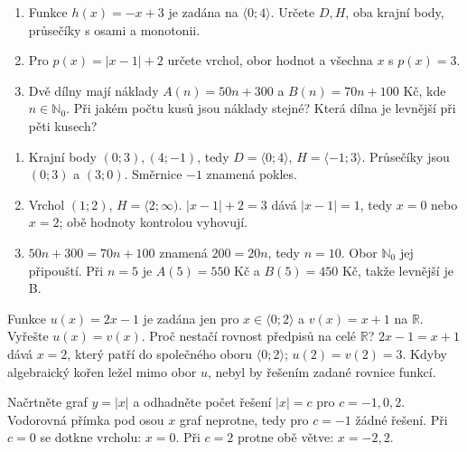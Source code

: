 \documentclass[11pt,a4paper]{article}
\begin{document}
\newpage
{}
\begin{zadaniReseniBox}
\begin{enumerate}[label=\alph*)]
\item Funkce $h(x)=-x+3$ je zadána na $\langle0;4\rangle$. Určete $D,H$, oba krajní body, průsečíky s osami a monotonii.
\item Pro $p(x)=|x-1|+2$ určete vrchol, obor hodnot a všechna $x$ s $p(x)=3$.
\item Dvě dílny mají náklady $A(n)=50n+300$ a $B(n)=70n+100$ Kč, kde $n\in\mathbb N_0$. Při jakém počtu kusů jsou náklady stejné? Která dílna je levnější při pěti kusech?
\end{enumerate}
\tcblower
\begin{enumerate}[label=\alph*)]
\item Krajní body $(0;3),(4;-1)$, tedy $D=\langle0;4\rangle$, $H=\langle-1;3\rangle$. Průsečíky jsou $(0;3)$ a $(3;0)$. Směrnice $-1$ znamená pokles.
\item Vrchol $(1;2)$, $H=\langle2;\infty)$. $|x-1|+2=3$ dává $|x-1|=1$, tedy $x=0$ nebo $x=2$; obě hodnoty kontrolou vyhovují.
\item $50n+300=70n+100$ znamená $200=20n$, tedy $n=10$. Obor $\mathbb N_0$ jej připouští. Při $n=5$ je $A(5)=550$ Kč a $B(5)=450$ Kč, takže levnější je B.
\end{enumerate}
\end{zadaniReseniBox}
\begin{zadaniReseniBox}
Funkce $u(x)=2x-1$ je zadána jen pro $x\in\langle0;2\rangle$ a $v(x)=x+1$ na $\mathbb R$. Vyřešte $u(x)=v(x)$. Proč nestačí rovnost předpisů na celé $\mathbb R$?
\tcblower
$2x-1=x+1$ dává $x=2$, který patří do společného oboru $\langle0;2\rangle$; $u(2)=v(2)=3$. Kdyby algebraický kořen ležel mimo obor $u$, nebyl by řešením zadané rovnice funkcí.
\end{zadaniReseniBox}
\begin{zadaniReseniBox}
Načrtněte graf $y=|x|$ a odhadněte počet řešení $|x|=c$ pro $c=-1,0,2$.
\tcblower
Vodorovná přímka pod osou $x$ graf neprotne, tedy pro $c=-1$ žádné řešení. Při $c=0$ se dotkne vrcholu: $x=0$. Při $c=2$ protne obě větve: $x=-2,2$.
\end{zadaniReseniBox}
\end{document}
